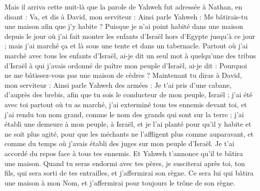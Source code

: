 \begin{multicols}{2}
Mais il arriva cette nuit-là que la parole de Yahweh fut adressée à Nathan, en disant :
Va, et dis à David, mon serviteur : Ainsi parle Yahweh : Me bâtirais-tu une maison afin que j’y habite ?
Puisque je n'ai point habité dans une maison depuis le jour où j'ai fait monter les enfants d'Israël hors d'Egypte jusqu'à ce jour ; mais j'ai marché ça et là sous une tente et dans un tabernacle.
Partout où j'ai marché avec tous les enfants d'Israël, ai-je dit un seul mot à quelqu'une des tribus d'Israël à qui j’avais ordonné de paître mon peuple d'Israël, ai-je dit : Pourquoi ne me bâtissez-vous pas une maison de cèdres ?
Maintenant tu diras à David, mon serviteur : Ainsi parle Yahweh des armées : Je t'ai pris d’une cabane, d’auprès des brebis, afin que tu sois le conducteur de mon peuple, Israël ;
j'ai été avec toi partout où tu as marché, j'ai exterminé tous tes ennemis devant toi, et j'ai rendu ton nom grand, comme le nom des grands qui sont sur la terre ;
j’ai établi une demeure à mon peuple, à Israël, et je l’ai planté pour qu'il y habite et ne soit plus agité, pour que les méchants ne l’affligent plus comme auparavant,
et comme du temps où j'avais établi des juges sur mon peuple d'Israël. Je t'ai accordé du repos face à tous tes ennemis. Et Yahweh t'annonce qu'il te bâtira une maison.
Quand tu seras endormi avec tes pères, je susciterai après toi, ton fils, qui sera sorti de tes entrailles, et j'affermirai son règne.
Ce sera lui qui bâtira une maison à mon Nom, et j'affermirai pour toujours le trône de son règne.

\end{multicols}
